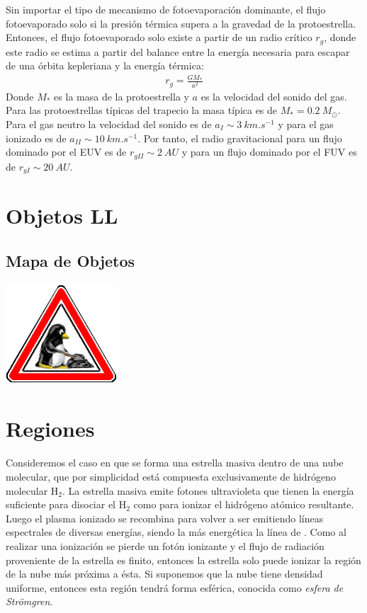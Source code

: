 Sin importar el tipo de mecanismo de fotoevaporación dominante, el flujo fotoevaporado solo si la presión térmica supera a la gravedad de la protoestrella. Entonces, el flujo fotoevaporado solo existe a partir de un radio crítico $r_g$, donde este radio se estima a partir del balance entre la energía necesaria para escapar de una órbita kepleriana y la energía térmica:
\begin{align}
  r_g = \frac{GM_*}{a^2}
\end{align}
Donde $M_*$ es la masa de la protoestrella y $a$ es la velocidad del sonido del gas. Para las protoestrellas típicas del trapecio la masa típica es de
$M_* = 0.2~M_\odot$. Para el gas neutro la velocidad del sonido es de $a_I \sim \SI{3}{km.s^{-1}}$ y para el gas ionizado es de $a_{II} \sim \SI{10}{km.s^{-1}}$.
Por tanto, el radio gravitacional para un flujo dominado por el EUV es de $r_{gII} \sim \SI{2}{AU}$ y para un flujo dominado por el FUV es de $r_{gI} \sim \SI{20}{AU}$.
\section{Objetos LL}
\subsection{Mapa de Objetos}
\includegraphics[width=0.1\linewidth]{./Figures/tux-development}
\section[Regiones \Ion{H}{II}]{Regiones  \citep{Stahler:2004}}
\label{sec:HII}
\newcommand\Nio{\ensuremath{\mathcal{N}}}

Consideremos el caso en que se forma una estrella masiva dentro de una nube molecular, que por simplicidad está compuesta exclusivamente de hidrógeno molecular $\mathrm{H_2}$. La estrella masiva emite fotones ultravioleta que tienen la energía suficiente para disociar el $\mathrm{H_2}$  como para ionizar el hidrógeno atómico resultante. Luego el plasma ionizado se recombina para volver a ser  emitiendo líneas espectrales de diversas energías, siendo la más energética la línea de . Como al realizar una ionización se pierde un fotón ionizante y el flujo de radiación proveniente de la estrella es finito, entonces la estrella solo puede ionizar la región de la nube más próxima a ésta. Si suponemos que la nube tiene densidad uniforme, entonces esta región tendrá forma esférica, conocida como \textit{esfera de Strömgren}.

